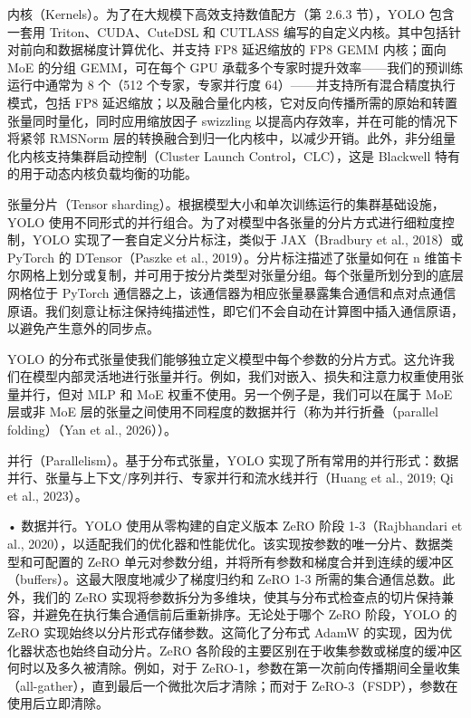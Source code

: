 \documentclass[
  10
]{article}
\begin{document}
内核（Kernels）。为了在大规模下高效支持数值配方（第 2.6.3 节），YOLO 包含一套用 Triton、CUDA、CuteDSL 和 CUTLASS 编写的自定义内核。其中包括针对前向和数据梯度计算优化、并支持 FP8 延迟缩放的 FP8 GEMM 内核；面向 MoE 的分组 GEMM，可在每个 GPU 承载多个专家时提升效率——我们的预训练运行中通常为 8 个（512 个专家，专家并行度 64）——并支持所有混合精度执行模式，包括 FP8 延迟缩放；以及融合量化内核，它对反向传播所需的原始和转置张量同时量化，同时应用缩放因子 swizzling 以提高内存效率，并在可能的情况下将紧邻 RMSNorm 层的转换融合到归一化内核中，以减少开销。此外，非分组量化内核支持集群启动控制（Cluster Launch Control，CLC），这是 Blackwell 特有的用于动态内核负载均衡的功能。

张量分片（Tensor sharding）。根据模型大小和单次训练运行的集群基础设施，YOLO 使用不同形式的并行组合。为了对模型中各张量的分片方式进行细粒度控制，YOLO 实现了一套自定义分片标注，类似于 JAX（Bradbury et al., 2018）或 PyTorch 的 DTensor（Paszke et al., 2019）。分片标注描述了张量如何在 n 维笛卡尔网格上划分或复制，并可用于按分片类型对张量分组。每个张量所划分到的底层网格位于 PyTorch 通信器之上，该通信器为相应张量暴露集合通信和点对点通信原语。我们刻意让标注保持纯描述性，即它们不会自动在计算图中插入通信原语，以避免产生意外的同步点。

YOLO 的分布式张量使我们能够独立定义模型中每个参数的分片方式。这允许我们在模型内部灵活地进行张量并行。例如，我们对嵌入、损失和注意力权重使用张量并行，但对 MLP 和 MoE 权重不使用。另一个例子是，我们可以在属于 MoE 层或非 MoE 层的张量之间使用不同程度的数据并行（称为并行折叠（parallel folding）（Yan et al., 2026））。

并行（Parallelism）。基于分布式张量，YOLO 实现了所有常用的并行形式：数据并行、张量与上下文/序列并行、专家并行和流水线并行（Huang et al., 2019; Qi et al., 2023）。

• 数据并行。YOLO 使用从零构建的自定义版本 ZeRO 阶段 1-3（Rajbhandari et al., 2020），以适配我们的优化器和性能优化。该实现按参数的唯一分片、数据类型和可配置的 ZeRO 单元对参数分组，并将所有参数和梯度合并到连续的缓冲区（buffers）。这最大限度地减少了梯度归约和 ZeRO 1-3 所需的集合通信总数。此外，我们的 ZeRO 实现将参数拆分为多维块，使其与分布式检查点的切片保持兼容，并避免在执行集合通信前后重新排序。无论处于哪个 ZeRO 阶段，YOLO 的 ZeRO 实现始终以分片形式存储参数。这简化了分布式 AdamW 的实现，因为优化器状态也始终自动分片。ZeRO 各阶段的主要区别在于收集参数或梯度的缓冲区何时以及多久被清除。例如，对于 ZeRO-1，参数在第一次前向传播期间全量收集（all-gather），直到最后一个微批次后才清除；而对于 ZeRO-3（FSDP），参数在使用后立即清除。
\end{document}
